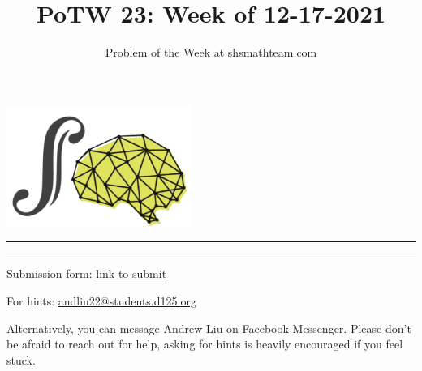 \documentclass{article}
\title{{\fontfamily{lmss}\selectfont \vspace{-0.5cm}
\textbf{PoTW 23: Week of 12-17-2021}}}
\author{Problem of the Week at \href{https://shsmathteam.com/problem-of-the-week/}{shsmathteam.com}}
\date{}
\newcommand{\V}{

\vspace{\baselineskip}

}
\begin{document}
\noindent\hfill\includegraphics[width=6cm]{logo.png}\hfill\hfill\newline
\rule{\textwidth}{1pt} 

\setlength{\parindent}{0cm}
{\let\newpage\relax\maketitle}


\vspace{-0.45cm}\rule{\textwidth}{1pt} \vspace{0.3cm}

{\large Submission form: \href{https://forms.gle/EHPS5WeVKvznCnp67}{link to submit}\V}

{\large For hints: \href{mailto:andliu22@students.d125.org}{andliu22@students.d125.org}}\medskip

Alternatively, you can message Andrew Liu on Facebook Messenger. Please don't be afraid to reach out for help, asking for hints is heavily encouraged if you feel stuck.\V


\end{document}

